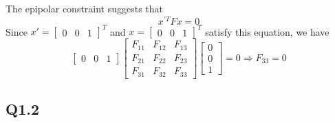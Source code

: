 \documentclass{scrbook}
\begin{document}
The epipolar constraint suggests that
\begin{equation*}
x^{'T}Fx=0
\end{equation*}
Since $x'=\left[\begin{array}{ccc}
0 & 0 & 1
\end{array}\right]^{T}$ and $x=\left[\begin{array}{ccc}
0 & 0 & 1
\end{array}\right]^{T}$ satisfy this equation, we have
\begin{equation*}
\left[\begin{array}{ccc}
0 & 0 & 1
\end{array}\right]\begin{bmatrix}
F_{11} & F_{12} & F_{13}\\
F_{21} & F_{22} & F_{23}\\
F_{31} & F_{32} & F_{33}
\end{bmatrix}\left[\begin{array}{c}
0\\
0\\
1
\end{array}\right]=0\Longrightarrow F_{33}=0
\end{equation*}
\subsection{Q1.2}
\end{document}
